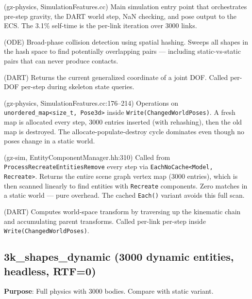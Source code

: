 \documentclass[11pt, a4paper]{article}
\begin{document}
\begin{description}[style=nextline, leftmargin=1.5cm]
\item[\texttt{WorldForwardStep}] (gz-physics, SimulationFeatures.cc) Main simulation entry point that orchestrates pre-step gravity, the DART world step, NaN checking, and pose output to the ECS. The 3.1\% self-time is the per-link iteration over 3000 links.
\item[\texttt{dxHashSpace::collide}] (ODE) Broad-phase collision detection using spatial hashing. Sweeps all shapes in the hash space to find potentially overlapping pairs --- including static-vs-static pairs that can never produce contacts.
\item[\texttt{DegreeOfFreedom::getPosition}] (DART) Returns the current generalized coordinate of a joint DOF. Called per-DOF per-step during skeleton state queries.
\item[\texttt{std::\_Hashtable} (26.8\%)] (gz-physics, SimulationFeatures.cc:176--214) Operations on \texttt{unordered\_map<size\_t, Pose3d>} inside \texttt{Write(ChangedWorldPoses)}. A fresh map is allocated every step, 3000 entries inserted (with rehashing), then the old map is destroyed. The allocate-populate-destroy cycle dominates even though no poses change in a static world.
\item[\texttt{Graph::Vertices} (13.5\%)] (gz-sim, EntityComponentManager.hh:310) Called from \texttt{ProcessRecreateEntitiesRemove} every step via \texttt{EachNoCache<Model, Recreate>}. Returns the entire scene graph vertex map (3000 entries), which is then scanned linearly to find entities with \texttt{Recreate} components. Zero matches in a static world --- pure overhead. The cached \texttt{Each()} variant avoids this full scan.
\item[\texttt{Frame::getWorldTransform}] (DART) Computes world-space transform by traversing up the kinematic chain and accumulating parent transforms. Called per-link per-step inside \texttt{Write(ChangedWorldPoses)}.
\end{description}

\hypertarget{k_shapes_dynamic-3000-dynamic-entities-headless-rtf0}{%
\subsection{3k\_shapes\_dynamic (3000 dynamic entities, headless,
RTF=0)}\label{k_shapes_dynamic-3000-dynamic-entities-headless-rtf0}}

\textbf{Purpose}: Full physics with 3000 bodies. Compare with static
variant.
\end{document}
